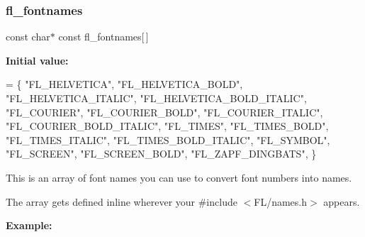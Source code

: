 \subsubsection{\texorpdfstring{fl\+\_\+fontnames}{fl\_fontnames}}
{\footnotesize\ttfamily const char$\ast$ const fl\+\_\+fontnames\mbox{[}$\,$\mbox{]}}

{\bfseries Initial value\+:}
\begin{DoxyCode}
=
\{
  \textcolor{stringliteral}{"FL\_HELVETICA"},
  \textcolor{stringliteral}{"FL\_HELVETICA\_BOLD"},
  \textcolor{stringliteral}{"FL\_HELVETICA\_ITALIC"},
  \textcolor{stringliteral}{"FL\_HELVETICA\_BOLD\_ITALIC"},
  \textcolor{stringliteral}{"FL\_COURIER"},
  \textcolor{stringliteral}{"FL\_COURIER\_BOLD"},
  \textcolor{stringliteral}{"FL\_COURIER\_ITALIC"},
  \textcolor{stringliteral}{"FL\_COURIER\_BOLD\_ITALIC"},
  \textcolor{stringliteral}{"FL\_TIMES"},
  \textcolor{stringliteral}{"FL\_TIMES\_BOLD"},
  \textcolor{stringliteral}{"FL\_TIMES\_ITALIC"},
  \textcolor{stringliteral}{"FL\_TIMES\_BOLD\_ITALIC"},
  \textcolor{stringliteral}{"FL\_SYMBOL"},
  \textcolor{stringliteral}{"FL\_SCREEN"},
  \textcolor{stringliteral}{"FL\_SCREEN\_BOLD"},
  \textcolor{stringliteral}{"FL\_ZAPF\_DINGBATS"},
\}
\end{DoxyCode}
This is an array of font names you can use to convert font numbers into names.

The array gets defined inline wherever your \textquotesingle{}\#include $<$F\+L/names.\+h$>$\textquotesingle{} appears.

{\bfseries Example\+:} 
 